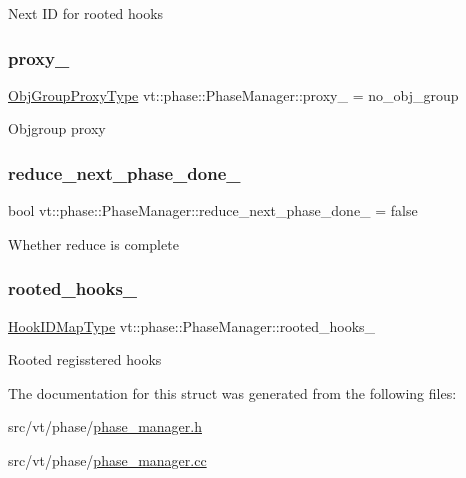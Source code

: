 Next ID for rooted hooks \mbox{\label{structvt_1_1phase_1_1_phase_manager_a119ac185c79c50761d7e8c3f68b751e7}} 
\subsubsection{\texorpdfstring{proxy\+\_\+}{proxy\_}}
{\footnotesize\ttfamily \hyperlink{namespacevt_ad7cae989df485fccca57f0792a880a8e}{Obj\+Group\+Proxy\+Type} vt\+::phase\+::\+Phase\+Manager\+::proxy\+\_\+ = no\+\_\+obj\+\_\+group\hspace{0.3cm}{\ttfamily [private]}}

Objgroup proxy \mbox{\label{structvt_1_1phase_1_1_phase_manager_a28428326d10fe9485d3da07e8650d352}} 
\subsubsection{\texorpdfstring{reduce\+\_\+next\+\_\+phase\+\_\+done\+\_\+}{reduce\_next\_phase\_done\_}}
{\footnotesize\ttfamily bool vt\+::phase\+::\+Phase\+Manager\+::reduce\+\_\+next\+\_\+phase\+\_\+done\+\_\+ = false\hspace{0.3cm}{\ttfamily [private]}}

Whether reduce is complete \mbox{\label{structvt_1_1phase_1_1_phase_manager_a6a2b1be3c11f4fc91bfb84cc2c47c545}} 
\subsubsection{\texorpdfstring{rooted\+\_\+hooks\+\_\+}{rooted\_hooks\_}}
{\footnotesize\ttfamily \hyperlink{structvt_1_1phase_1_1_phase_manager_a7f9784fa7550beaa1e7d59e639169a8b}{Hook\+I\+D\+Map\+Type} vt\+::phase\+::\+Phase\+Manager\+::rooted\+\_\+hooks\+\_\+\hspace{0.3cm}{\ttfamily [private]}}

Rooted regisstered hooks 

The documentation for this struct was generated from the following files\+:\begin{DoxyCompactItemize}
\item 
src/vt/phase/\hyperlink{phase__manager_8h}{phase\+\_\+manager.\+h}\item 
src/vt/phase/\hyperlink{phase__manager_8cc}{phase\+\_\+manager.\+cc}\end{DoxyCompactItemize}
